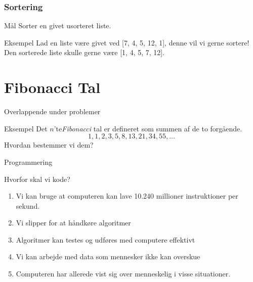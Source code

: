 \documentclass[12pt,t]{beamer}
\begin{document}
        \begin{frame}
          \frametitle{Sortering}
          \begin{block}{Mål}
              Sorter en givet usorteret liste.
          \end{block}
          \pause

          \begin{exampleblock}{Eksempel}
          Lad en liste være givet ved [7, 4, 5, 12, 1], denne vil vi gerne sortere!
          Den sorterede liste skulle gerne være [1, 4, 5, 7, 12].
          \end{exampleblock}
        \end{frame}

    \section{Fibonacci Tal}
        \begin{frame}[c]{Overlappende under problemer}
            \begin{block}{Eksempel}
                Det $n$'te\emph{Fibonacci} tal er defineret som summen af de to
                forgående.
                $$
                  1,1,2,3,5,8,13,21,34,55, \dots
                $$
                \pause
                Hvordan bestemmer vi dem?
            \end{block}
        \end{frame}


        \begin{frame}{Programmering}
                \begin{block}{Hvorfor skal vi kode?}
                    \begin{enumerate}
                        \item Vi kan bruge at computeren kan lave 10.240 millioner
                              instruktioner per sekund. \pause
                        \item Vi slipper for at håndkøre algoritmer \pause
                        \item Algoritmer kan testes og udføres med computere effektivt \pause
                        \item Vi kan arbejde med data som mennesker ikke kan overskue \pause
                        \item Computeren har allerede vist sig over menneskelig i visse
                        situationer.
                    \end{enumerate}
                \end{block}
            \end{frame}
\end{document}
